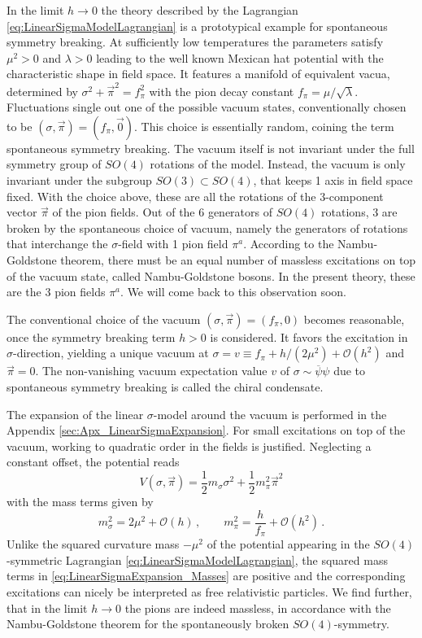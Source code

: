 In the limit ${h\to0}$ the theory described by the Lagrangian \eqref{eq:LinearSigmaModelLagrangian} is a prototypical example for spontaneous symmetry breaking. At sufficiently low temperatures the parameters satisfy ${\mu^2>0}$ and ${\lambda>0}$ leading to the well known Mexican hat potential with the characteristic shape in field space. It features a manifold of equivalent vacua, determined by $\sigma^2+\vec{\pi}^2=f_\pi^2$ with the pion decay constant ${f_\pi=\mu/\sqrt{\lambda}}$. Fluctuations single out one of the possible vacuum states, conventionally chosen to be $(\sigma,\vec{\pi})=(f_\pi,\vec{0})$. This choice is essentially random, coining the term spontaneous symmetry breaking. The vacuum itself is not invariant under the full symmetry group of $SO(4)$ rotations of the model. Instead, the vacuum is only invariant under the subgroup ${SO(3)\subset SO(4)}$, that keeps 1 axis in field space fixed. With the choice above, these are all the rotations of the 3-component vector $\vec{\pi}$ of the pion fields. Out of the 6 generators of $SO(4)$ rotations, 3 are broken by the spontaneous choice of vacuum, namely the generators of rotations that interchange the $\sigma$-field with 1 pion field $\pi^a$. According to the Nambu-Goldstone theorem, there must be an equal number of massless excitations on top of the vacuum state, called Nambu-Goldstone bosons. In the present theory, these are the 3 pion fields $\pi^a$. We will come back to this observation soon.

The conventional choice of the vacuum ${(\sigma,\vec{\pi})=(f_\pi,0)}$ becomes reasonable, once the symmetry breaking term $h>0$ is considered. It favors the excitation in $\sigma$-direction, yielding a unique vacuum at ${\sigma=v\equiv f_\pi+h/(2\mu^2)+\mathcal{O}(h^2)}$ and $\vec{\pi}=0$. The non-vanishing vacuum expectation value $v$ of ${\sigma\sim\overline{\psi}\psi}$ due to spontaneous symmetry breaking is called the chiral condensate.

The expansion of the linear $\sigma$-model around the vacuum is performed in the Appendix \ref{sec:Apx_LinearSigmaExpansion}. For small excitations on top of the vacuum, working to quadratic order in the fields is justified. Neglecting a constant offset, the potential reads
\begin{equation}
    V(\sigma,\vec{\pi})=\frac{1}{2}m_\sigma\sigma^2+\frac{1}{2}m_\pi^2\vec{\pi}^2
\end{equation}
with the mass terms given by
\begin{equation}
    m_\sigma^2=2\mu^2+\mathcal{O}(h)\,,\qquad m_\pi^2=\frac{h}{f_\pi}+\mathcal{O}(h^2)\,.
    \label{eq:LinearSigmaExpansion_Masses}
\end{equation}
Unlike the squared curvature mass ${-\mu^2}$ of the potential appearing in the $SO(4)$-symmetric Lagrangian \ref{eq:LinearSigmaModelLagrangian}, the squared mass terms in \eqref{eq:LinearSigmaExpansion_Masses} are positive and the corresponding excitations can nicely be interpreted as free relativistic particles. We find further, that in the limit $h\to 0$ the pions are indeed massless, in accordance with the Nambu-Goldstone theorem for the spontaneously broken $SO(4)$-symmetry. 

